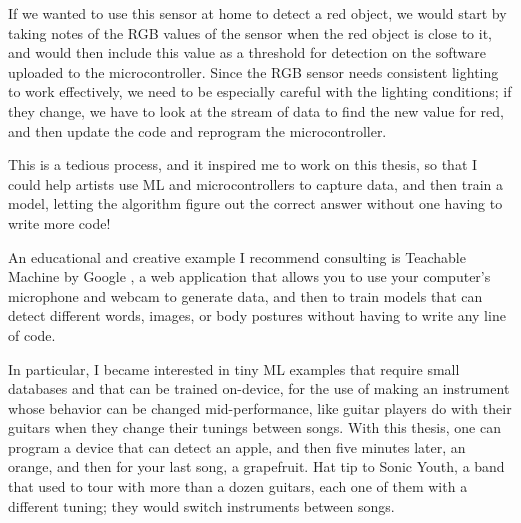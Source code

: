 If we wanted to use this sensor at home to detect a red object, we would start by taking notes of the \acrshort{RGB} values of the sensor when the red object is close to it, and would then include this value as a threshold for detection on the software uploaded to the microcontroller. Since the \acrshort{RGB} sensor needs consistent lighting to work effectively, we need to be especially careful with the lighting conditions; if they change, we have to look at the stream of data to find the new value for red, and then update the code and reprogram the microcontroller.

This is a tedious process, and it inspired me to work on this thesis, so that I could help artists use \acrshort{ML} and microcontrollers to capture data, and then train a model, letting the algorithm figure out the correct answer without one having to write more code!

An educational and creative example I recommend consulting is Teachable Machine by Google \cite{website-google-teachable-machine}, a web application that allows you to use your computer's microphone and webcam to generate data, and then to train models that can detect different words, images, or body postures without having to write any line of code.

In particular, I became interested in tiny \acrshort{ML} examples that require small databases and that can be trained on-device, for the use of making an instrument whose behavior can be changed mid-performance, like guitar players do with their guitars when they change their tunings between songs. With this thesis, one can program a device that can detect an apple, and then five minutes later, an orange, and then for your last song, a grapefruit. Hat tip to Sonic Youth, a band that used to tour with more than a dozen guitars, each one of them with a different tuning; they would switch instruments between songs.

